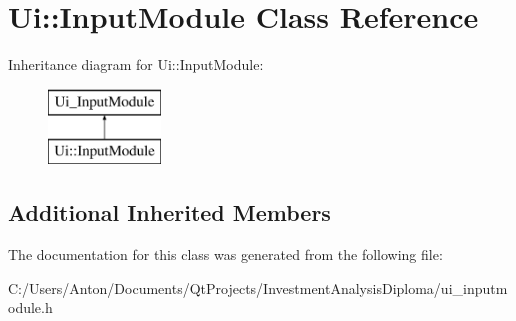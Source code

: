 \hypertarget{class_ui_1_1_input_module}{}\section{Ui\+:\+:Input\+Module Class Reference}
\label{class_ui_1_1_input_module}
Inheritance diagram for Ui\+:\+:Input\+Module\+:\begin{figure}[H]
\begin{center}
\leavevmode
\includegraphics[height=2.000000cm]{class_ui_1_1_input_module}
\end{center}
\end{figure}
\subsection*{Additional Inherited Members}


The documentation for this class was generated from the following file\+:\begin{DoxyCompactItemize}
\item 
C\+:/\+Users/\+Anton/\+Documents/\+Qt\+Projects/\+Investment\+Analysis\+Diploma/ui\+\_\+inputmodule.\+h\end{DoxyCompactItemize}
